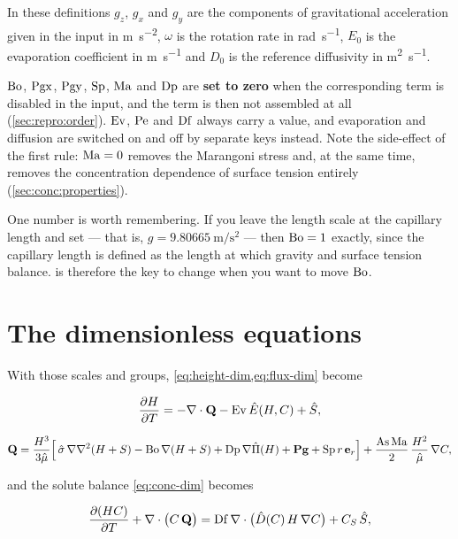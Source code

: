 In these definitions $g_z$, $g_x$ and $g_y$ are the components of gravitational
acceleration given in the input in \si{\metre\per\second\squared}, $\omega$ is
the rotation rate in \si{\radian\per\second}, $E_0$ is the evaporation
coefficient in \si{\metre\per\second} and $D_0$ is the reference diffusivity in
\si{\metre\squared\per\second}.

$\mathrm{Bo}$, $\mathrm{Pgx}$, $\mathrm{Pgy}$, $\mathrm{Sp}$, $\mathrm{Ma}$ and $\mathrm{Dp}$ are \textbf{set to zero} when
the corresponding term is disabled in the input, and the term is then not
assembled at all (\cref{sec:repro:order}). $\mathrm{Ev}$, $\mathrm{Pe}$ and $\mathrm{Df}$ always carry a value, and evaporation and
diffusion are switched on and off by separate keys instead. Note the
side-effect of the first rule: $\mathrm{Ma} = 0$ removes the Marangoni stress and, at
the same time, removes the concentration dependence of surface tension entirely
(\cref{sec:conc:properties}).

One number is worth remembering. If you leave the length scale at the capillary
length and set  --- that is,
$g = \SI{9.80665}{\metre\per\second\squared}$ --- then $\mathrm{Bo} = 1$ exactly, since
the capillary length is defined as the length at which gravity and surface
tension balance.  is therefore the key to change when you want to
move $\mathrm{Bo}$.

\section{The dimensionless equations}
\label{sec:governing:nondim}

With those scales and groups, \cref{eq:height-dim,eq:flux-dim} become

\begin{equation}\label{eq:height}
  \frac{\partial H}{\partial T} = -\nabla\cdot\mathbf{Q} - \mathrm{Ev}\,\hat{E}(H,C) + \hat{S},
\end{equation}

\begin{equation}\label{eq:flux}
  \mathbf{Q} = \frac{H^{3}}{3\hat{\mu}}
    \Bigl[\,\hat{\sigma}\,\nabla\nabla^{2}(H+S)
      - \mathrm{Bo}\,\nabla(H+S)
      + \mathrm{Dp}\,\nabla\hat{\Pi}(H)
      + \mathbf{Pg}
      + \mathrm{Sp}\,r\,\mathbf{e}_r \Bigr]
    + \frac{\mathrm{As}\,\mathrm{Ma}}{2}\,\frac{H^{2}}{\hat{\mu}}\,\nabla C,
\end{equation}

and the solute balance \cref{eq:conc-dim} becomes

\begin{equation}\label{eq:conc}
  \frac{\partial (HC)}{\partial T} + \nabla\cdot\bigl(C\,\mathbf{Q}\bigr)
    = \mathrm{Df}\,\nabla\cdot\bigl(\hat{D}(C)\,H\,\nabla C\bigr) + C_S\,\hat{S},
\end{equation}

